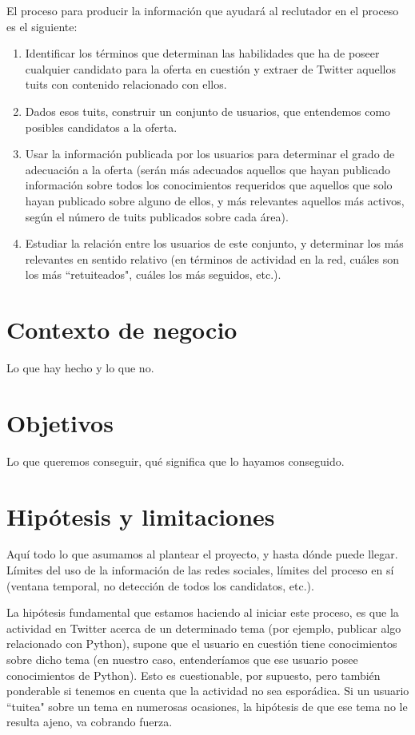 El proceso para producir la información que ayudará al reclutador en el proceso es el siguiente:
\begin{enumerate}
\item Identificar los términos que determinan las habilidades que ha de poseer cualquier candidato
para la oferta en cuestión y extraer de Twitter aquellos tuits con contenido relacionado con ellos.
\item Dados esos tuits, construir un conjunto de usuarios, que entendemos como posibles candidatos 
a la oferta.
\item Usar la información publicada por los usuarios para determinar el grado de adecuación a la oferta
(serán más adecuados aquellos que hayan publicado información sobre todos los conocimientos requeridos que 
aquellos que solo hayan publicado sobre alguno de ellos, y más relevantes aquellos más activos, según el
número de tuits publicados sobre cada área).
\item Estudiar la relación entre los usuarios de este conjunto, y determinar los más relevantes en sentido
relativo (en términos de actividad en la red, cuáles son los más ``retuiteados", cuáles los más seguidos, etc.).
\end{enumerate}









\section{Contexto de negocio}
Lo que hay hecho y lo que no.
\section{Objetivos}
Lo que queremos conseguir, qué significa que lo hayamos conseguido.
\section{Hip\'otesis y limitaciones}
Aquí todo lo que asumamos al plantear el proyecto, y hasta dónde puede llegar. Límites del uso de la información
de las redes sociales, límites del proceso en sí (ventana temporal, no detección de todos los candidatos, etc.).

La hipótesis fundamental que estamos haciendo al iniciar este proceso, es que la actividad en Twitter
acerca de un determinado tema (por ejemplo, publicar algo relacionado con Python), supone
que el usuario en cuestión tiene conocimientos sobre dicho tema (en nuestro caso, entenderíamos que ese
usuario posee conocimientos de Python). Esto es cuestionable, por supuesto, pero también ponderable
si tenemos en cuenta que la actividad no sea esporádica. Si un usuario ``tuitea" sobre un tema
en numerosas ocasiones, la hipótesis de que ese tema no le resulta ajeno, va cobrando fuerza.

